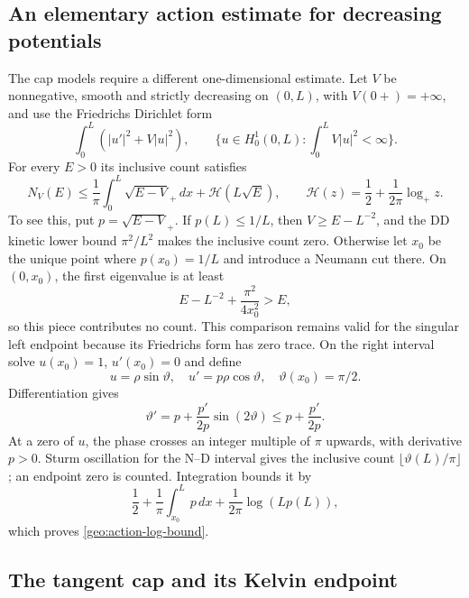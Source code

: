\documentclass[11pt,reqno]{amsart}
\numberwithin{equation}{section}
\begin{document}
\subsection{An elementary action estimate for decreasing potentials}
\label{geo:action-log}

The cap models require a different one-dimensional estimate.  Let $V$
be nonnegative, smooth and strictly decreasing on $(0,L)$, with
$V(0+)=+\infty$, and use the Friedrichs Dirichlet form
\[
 \int_0^L(|u'|^2+V|u|^2),\qquad
 \{u\in H^1_0(0,L):\int_0^LV|u|^2<\infty\}.
\]
For every $E>0$ its inclusive count satisfies
\begin{equation}\label{geo:action-log-bound}
 N_V(E)\le\frac1\pi\int_0^L\sqrt{E-V}_+\,dx+\mathcal H(L\sqrt E),
 \qquad
 \mathcal H(z)=\frac12+\frac1{2\pi}\log_+z.
\end{equation}
To see this, put $p=\sqrt{E-V}_+$.  If $p(L)\le1/L$, then
$V\ge E-L^{-2}$, and the DD kinetic lower bound $\pi^2/L^2$ makes
the inclusive count zero.  Otherwise let $x_0$ be the unique point
where $p(x_0)=1/L$ and introduce a Neumann cut there.  On $(0,x_0)$,
the first eigenvalue is at least
\[
 E-L^{-2}+\frac{\pi^2}{4x_0^2}>E,
\]
so this piece contributes no count.  This comparison remains valid for
the singular left endpoint because its Friedrichs form has zero trace.
On the right interval solve $u(x_0)=1$, $u'(x_0)=0$ and define
\[
 u=\rho\sin\vartheta,\quad u'=p\rho\cos\vartheta,
 \quad\vartheta(x_0)=\pi/2.
\]
Differentiation gives
\[
 \vartheta'=p+\frac{p'}{2p}\sin(2\vartheta)
                     \le p+\frac{p'}{2p}.
\]
At a zero of $u$, the phase crosses an integer multiple of $\pi$
upwards, with derivative $p>0$.  Sturm oscillation for the N--D
interval gives the inclusive count $\lfloor\vartheta(L)/\pi\rfloor$;
an endpoint zero is counted.  Integration bounds it by
\[
 \frac12+\frac1\pi\int_{x_0}^Lp\,dx
                   +\frac1{2\pi}\log(Lp(L)),
\]
which proves \eqref{geo:action-log-bound}.

\subsection{The tangent cap and its Kelvin endpoint}
\label{geo:kelvin}
\end{document}
